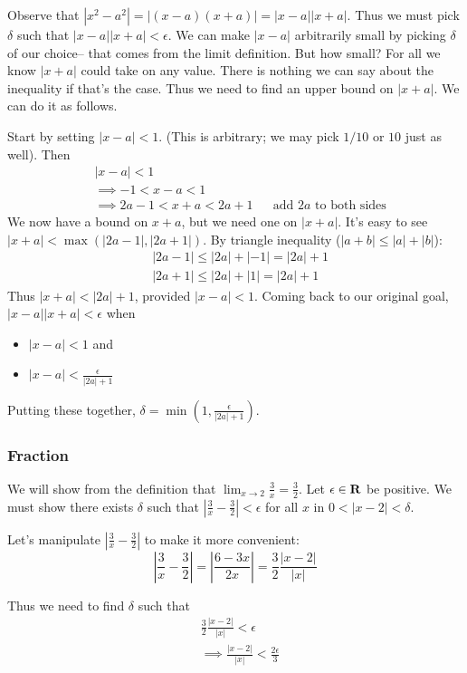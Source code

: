 \vs

Observe that $|x^2-a^2|=|(x-a)(x+a)|=|x-a||x+a|$. Thus we must pick $\delta$ such that $|x-a||x+a|<\epsilon$. We can make $|x-a|$ arbitrarily small by picking $\delta$ of our choice-- that comes from the limit definition. But how small? For all we know $|x+a|$ could take on any value. There is nothing we can say about the inequality if that's the case. Thus we need to find an upper bound on $|x+a|$. We can do it as follows.

\vs

Start by setting $|x-a|<1$. (This is arbitrary; we may pick $1/10$ or $10$ just as well). Then
\begin{align*}
    &|x-a|<1\\
    &\implies -1<x-a<1\\
    &\implies 2a-1<x+a<2a+1&&\text{add $2a$ to both sides}
\end{align*}
We now have a bound on $x+a$, but we need one on $|x+a|$. It's easy to see $|x+a|<\max(|2a-1|, |2a+1|)$. By triangle inequality ($|a+b|\leq|a|+|b|$):
\begin{align*}
    &|2a-1|\leq|2a|+|-1|=|2a|+1\\
    &|2a+1|\leq|2a|+|1|=|2a|+1
\end{align*}
Thus $|x+a|<|2a|+1$, provided $|x-a|<1$. Coming back to our original goal, $|x-a||x+a|<\epsilon$ when
\begin{itemize}
    \item $|x-a|<1$ and
    \item $|x-a|<\frac{\epsilon}{|2a|+1}$
\end{itemize}
Putting these together, $\delta=\min(1, \frac{\epsilon}{|2a|+1})$.

\subsubsection{Fraction}
We will show from the definition that $\lim_{x\to 2}\frac{3}{x}=\frac{3}{2}$. Let $\epsilon\in\mathbf{R}$ be positive. We must show there exists $\delta$ such that $|\frac{3}{x}-\frac{3}{2}|<\epsilon$ for all $x$ in $0<|x-2|<\delta$.

\vs

Let's manipulate $|\frac{3}{x}-\frac{3}{2}|$ to make it more convenient:
\[\left|\frac{3}{x}-\frac{3}{2}\right|=\left|\frac{6-3x}{2x}\right|=\frac{3}{2}\frac{|x-2|}{|x|}\]

Thus we need to find $\delta$ such that
\begin{align*}
&\frac{3}{2}\frac{|x-2|}{|x|}<\epsilon\\
&\implies \frac{|x-2|}{|x|}<\frac{2\epsilon}{3}\\
\end{align*}

